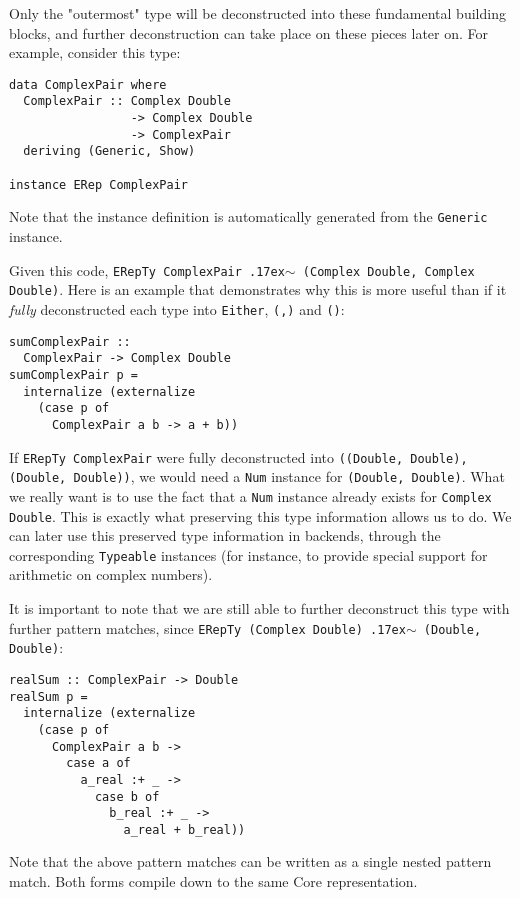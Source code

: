 \documentclass[sigplan,anonymous,review]{acmart}
\newcommand{\typeeq}{\raise.17ex\hbox{$\scriptstyle\mathtt{\sim}$}\,\;}
\newcommand{\ttt}{\texttt}
\begin{document}
Only the "outermost" type will be deconstructed into these fundamental building
blocks, and further deconstruction can take place on these pieces later on. For
example, consider this type:

\begin{lstlisting}
data ComplexPair where
  ComplexPair :: Complex Double
                 -> Complex Double
                 -> ComplexPair
  deriving (Generic, Show)

instance ERep ComplexPair
\end{lstlisting}

Note that the instance definition is automatically generated from the
\ttt{Generic} instance.

Given this code, \ttt{ERepTy ComplexPair \typeeq (Complex Double, Complex Double)}. Here
is an example that demonstrates why this is more useful than if it \textit{fully} deconstructed
each type into \ttt{Either}, \ttt{(,)} and \ttt{()}:

\begin{lstlisting}
sumComplexPair ::
  ComplexPair -> Complex Double
sumComplexPair p =
  internalize (externalize
    (case p of
      ComplexPair a b -> a + b))
\end{lstlisting}

If \ttt{ERepTy ComplexPair} were fully deconstructed into \ttt{((Double, Double),
(Double, Double))}, we would need a \ttt{Num} instance for \ttt{(Double,
Double)}.  What we really want is to use the fact that a \ttt{Num} instance
already exists for \ttt{Complex Double}. This is exactly what preserving this
type information allows us to do. We can later use this preserved type
information in backends, through the corresponding \ttt{Typeable} instances (for
instance, to provide special support for arithmetic on complex numbers).

It is important to note that we are still able to further deconstruct this type
with further pattern matches, since \ttt{ERepTy (Complex Double) \typeeq (Double, Double)}:

\begin{lstlisting}
realSum :: ComplexPair -> Double
realSum p =
  internalize (externalize
    (case p of
      ComplexPair a b ->
        case a of
          a_real :+ _ ->
            case b of
              b_real :+ _ ->
                a_real + b_real))
\end{lstlisting}

Note that the above pattern matches can be written as a single nested pattern
match. Both forms compile down to the same Core representation.
\end{document}
